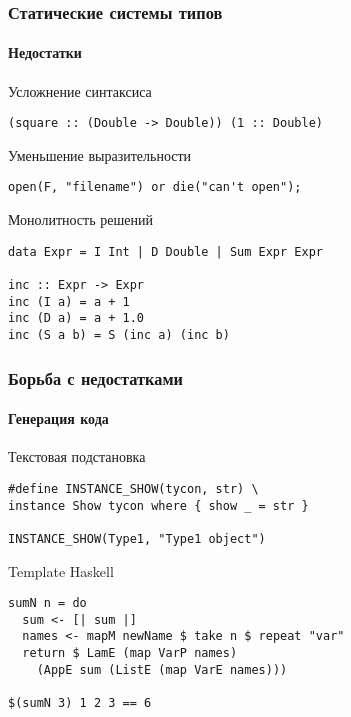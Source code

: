 \documentclass[ucs]{beamer}
\begin{document}
\begin{frame}[fragile]
  \frametitle{Статические системы типов}
  \framesubtitle{Недостатки}

  \begin{block}{Усложнение синтаксиса}
\begin{verbatim}
(square :: (Double -> Double)) (1 :: Double)
\end{verbatim}
  \end{block}

  \begin{block}{Уменьшение выразительности}
\begin{verbatim}
open(F, "filename") or die("can't open");
\end{verbatim}
  \end{block}

  \begin{block}{Монолитность решений}
\begin{verbatim}
data Expr = I Int | D Double | Sum Expr Expr

inc :: Expr -> Expr
inc (I a) = a + 1
inc (D a) = a + 1.0
inc (S a b) = S (inc a) (inc b)
\end{verbatim}
  \end{block}
\end{frame}

\begin{frame}[fragile]
  \frametitle{Борьба с недостатками}
  \framesubtitle{Генерация кода}

  \begin{block}{Текстовая подстановка}
\begin{verbatim}
#define INSTANCE_SHOW(tycon, str) \
instance Show tycon where { show _ = str }

INSTANCE_SHOW(Type1, "Type1 object")
\end{verbatim}
  \end{block}

  \begin{block}{Template Haskell}
\begin{verbatim}
sumN n = do
  sum <- [| sum |]
  names <- mapM newName $ take n $ repeat "var"
  return $ LamE (map VarP names)
    (AppE sum (ListE (map VarE names)))

$(sumN 3) 1 2 3 == 6
\end{verbatim}
  \end{block}
\end{frame}
\end{document}
